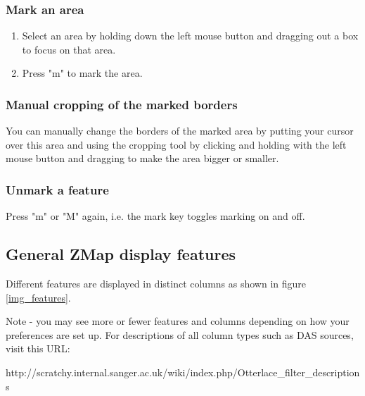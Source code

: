 \documentclass[letterpaper]{article}
\begin{document}
\subsubsection{Mark an area}
\begin{enumerate}
\item Select an area by holding down the left mouse button and dragging out a box to focus on that area.
\item Press "m" to mark the area.
\end{enumerate}

\subsubsection{Manual cropping of the marked borders}
You can manually change the borders of the marked area by putting your cursor over this area and using the cropping tool by clicking and holding with the left mouse button and dragging to make the area bigger or smaller.

\subsubsection{Unmark a feature}
Press "m" or "M" again, i.e. the mark key toggles marking on and off.

\subsection{General ZMap display features}
Different features are displayed in distinct columns as shown in figure \ref{img_features}.

Note - you may see more or fewer features and columns depending on how your preferences are set up. For descriptions of all column types such as DAS sources, visit this URL:

http://scratchy.internal.sanger.ac.uk/wiki/index.php/Otterlace\_filter\_descriptions
\end{document}
